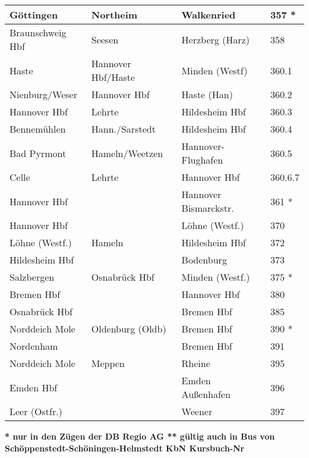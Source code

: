 \begin{table}[htbp]
\begin{center}
\begin{tabular}{|l|l|l|p{1cm}|}
Göttingen & Northeim & Walkenried & 357 * \\ \hline
Braunschweig Hbf & Seesen & Herzberg (Harz) & 358 \\ \hline
Haste & Hannover Hbf/Haste & Minden (Westf) & 360.1 \\ \hline
Nienburg/Weser & Hannover Hbf & Haste (Han) & 360.2 \\ \hline
Hannover Hbf & Lehrte & Hildesheim Hbf & 360.3 \\ \hline
Bennemühlen & Hann./Sarstedt & Hildesheim Hbf & 360.4 \\ \hline
Bad Pyrmont & Hameln/Weetzen & Hannover-Flughafen & 360.5 \\ \hline
Celle & Lehrte & Hannover Hbf & 360.6.7 \\ \hline
Hannover Hbf &  & Hannover Bismarckstr. & 361 * \\ \hline
Hannover Hbf &  & Löhne (Westf.) & 370 \\ \hline
Löhne (Westf.) & Hameln & Hildesheim Hbf & 372 \\ \hline
Hildesheim Hbf &  & Bodenburg & 373 \\ \hline
Salzbergen & Osnabrück Hbf & Minden (Westf.) & 375 * \\ \hline
Bremen Hbf &  & Hannover Hbf & 380 \\ \hline
Osnabrück Hbf &  & Bremen Hbf & 385 \\ \hline
Norddeich Mole & Oldenburg (Oldb) & Bremen Hbf & 390 * \\ \hline
Nordenham &  & Bremen Hbf & 391 \\ \hline
Norddeich Mole & Meppen & Rheine & 395 \\ \hline
Emden Hbf &  & Emden Außenhafen                     & 396 \\ \hline
Leer (Ostfr.) &  & Weener & 397 \\ \hline
\end{tabular}
\textbf{* nur in den Zügen der DB Regio AG ** gültig auch in Bus von
  Schöppenstedt-Schöningen-Helmstedt KbN Kursbuch-Nr}
\end{center}
\label{streckenkarte2}
\end{table}

